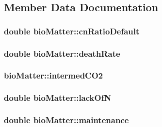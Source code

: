 \subsection{Member Data Documentation}
\hypertarget{classbio_matter_a325fa37c8d609f93e7845a1eb13e69f5}{
\subsubsection[{cnRatioDefault}]{\setlength{\rightskip}{0pt plus 5cm}double {\bf bioMatter::cnRatioDefault}}}
\label{classbio_matter_a325fa37c8d609f93e7845a1eb13e69f5}
\hypertarget{classbio_matter_a31e599ecc6d625bc325b03d5e32a6bb5}{
\subsubsection[{deathRate}]{\setlength{\rightskip}{0pt plus 5cm}double {\bf bioMatter::deathRate}}}
\label{classbio_matter_a31e599ecc6d625bc325b03d5e32a6bb5}
\hypertarget{classbio_matter_a7caed5f32d3daea9def8aa41408295de}{
\subsubsection[{intermedCO2}]{ {\bf bioMatter::intermedCO2}}}
\label{classbio_matter_a7caed5f32d3daea9def8aa41408295de}
\hypertarget{classbio_matter_a9214fdfd62a75f0146840fe03819263f}{
\subsubsection[{lackOfN}]{\setlength{\rightskip}{0pt plus 5cm}double {\bf bioMatter::lackOfN}}}
\label{classbio_matter_a9214fdfd62a75f0146840fe03819263f}
\hypertarget{classbio_matter_aeb728b264870ae8765d7aa01cc617de3}{
\subsubsection[{maintenance}]{\setlength{\rightskip}{0pt plus 5cm}double {\bf bioMatter::maintenance}}}
